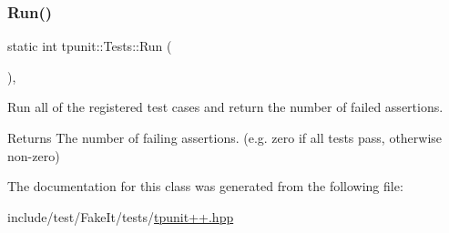 \subsubsection{\texorpdfstring{Run()}{Run()}}
{\footnotesize\ttfamily static int tpunit\+::\+Tests\+::\+Run (\begin{DoxyParamCaption}{ }\end{DoxyParamCaption})\hspace{0.3cm}{\ttfamily [inline]}, {\ttfamily [static]}}



Run all of the registered test cases and return the number of failed assertions. 

\begin{DoxyReturn}{Returns}
The number of failing assertions. (e.\+g. zero if all tests pass, otherwise non-\/zero) 
\end{DoxyReturn}


The documentation for this class was generated from the following file\+:\begin{DoxyCompactItemize}
\item 
include/test/\+Fake\+It/tests/\mbox{\hyperlink{tpunit_09_09_8hpp}{tpunit++.\+hpp}}\end{DoxyCompactItemize}
